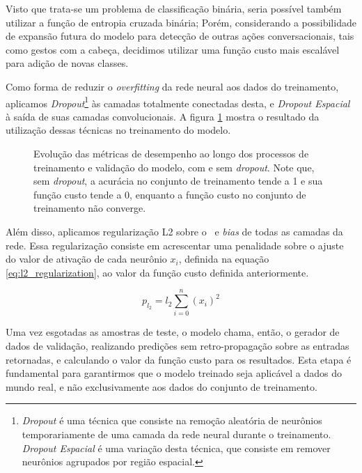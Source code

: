 Visto que trata-se um problema de classificação binária, seria possível também utilizar a função de entropia cruzada binária; Porém, considerando a possibilidade de expansão futura do modelo para detecção de outras ações conversacionais, tais como gestos com a cabeça, decidimos utilizar uma função custo mais escalável para adição de novas classes.

Como forma de reduzir o \textit{overfitting} da rede neural aos dados do treinamento, aplicamos \textit{Dropout}\footnote{\textit{Dropout} é uma técnica que consiste na remoção aleatória de neurônios temporariamente de uma camada da rede neural durante o treinamento. \textit{Dropout Espacial} é uma variação desta técnica, que consiste em remover neurônios agrupados por região espacial.} às camadas totalmente conectadas desta, e \textit{Dropout Espacial} à saída de suas camadas convolucionais.
A figura \ref{fig:training_metrics} mostra o resultado da utilização dessas técnicas no treinamento do modelo.

\begin{figure}[ht]
    \centering
    \resizebox{0.95\textwidth}{!}{
        
    }
    \caption{Evolução das métricas de desempenho ao longo dos processos de treinamento e validação do modelo, com e sem \textit{dropout}. Note que, sem \textit{dropout}, a acurácia no conjunto de treinamento tende a 1 e sua função custo tende a 0, enquanto a função custo no conjunto de treinamento não converge. }
    \label{fig:training_metrics}
\end{figure}

Além disso, aplicamos regularização L2 sobre o \ e \textit{bias} de todas as camadas da rede.
Essa regularização consiste em acrescentar uma penalidade sobre o ajuste do valor de ativação de cada neurônio $x_i$, definida na equação \ref{eq:l2_regularization}, ao valor da função custo definida anteriormente.

\begin{equation}\label{eq:l2_regularization}
    p_{l_2} = l_2 \sum\limits_{i=0}^n(x_i)^2
\end{equation}

Uma vez esgotadas as amostras de teste, o modelo chama, então, o gerador de dados de validação, realizando predições sem retro-propagação sobre as entradas retornadas, e calculando o valor da função custo para os resultados.
Esta etapa é fundamental para garantirmos que o modelo treinado seja aplicável a dados do mundo real, e não exclusivamente aos dados do conjunto de treinamento.

